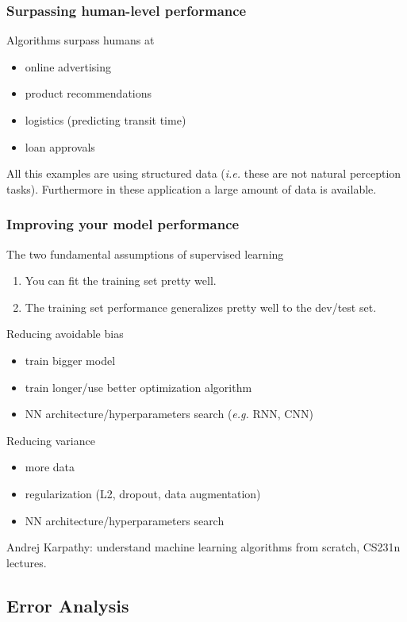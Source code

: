 \documentclass{article}
\begin{document}
\subsubsection{Surpassing human-level performance}
Algorithms surpass humans at
\begin{itemize}
  \item online advertising
  \item product recommendations
  \item logistics (predicting transit time)
  \item loan approvals
\end{itemize}
All this examples are using structured data (\emph{i.e.} these are not natural perception tasks).
Furthermore in these application a large amount of data is available.

\subsubsection{Improving your model performance}
The two fundamental assumptions of supervised learning
\begin{enumerate}
  \item You can fit the training set pretty well.
  \item The training set performance generalizes pretty well to the dev/test set.
\end{enumerate}
Reducing avoidable bias
\begin{itemize}
  \item train bigger model
  \item train longer/use better optimization algorithm
  \item NN architecture/hyperparameters search (\emph{e.g.} RNN, CNN)
\end{itemize}
Reducing variance
\begin{itemize}
  \item more data
  \item regularization (L2, dropout, data augmentation)
  \item NN architecture/hyperparameters search
\end{itemize}

Andrej Karpathy: understand machine learning algorithms from scratch, CS231n lectures.

\subsection{Error Analysis}
\end{document}
